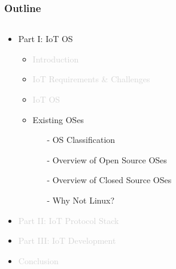 \documentclass{beamer}
\begin{document}
\begin{frame}
	\frametitle{Outline}
	\begin{columns}[c]
		\begin{column}{30cm}
			\vspace{.1cm}
			\begin{itemize}
				\justifying
				\item Part I: IoT OS
				\begin{itemize}
					\item \textcolor{LightGray}{Introduction}
					\item \textcolor{LightGray}{IoT Requirements \& Challenges}
					\item \textcolor{LightGray}{IoT OS}
					\item {Existing OSes}
					\begin{itemize}
						\item[-] OS Classification
						\item[-] Overview of Open Source OSes
						\item[-] Overview of Closed Source OSes
						\item[-] Why Not Linux?
					\end{itemize}
				\end{itemize}
				\item \textcolor{LightGray}{Part II: IoT Protocol Stack}
				\item \textcolor{LightGray}{Part III: IoT Development}
				\item \textcolor{LightGray}{Conclusion}
			\end{itemize}
		\end{column}
	\end{columns}
\end{frame}
\end{document}
